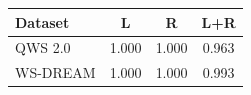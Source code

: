 \begin{tabular}{lccc}
\toprule
Dataset & L & R & L+R \\
\midrule
QWS 2.0 & 1.000 & 1.000 & 0.963 \\
WS-DREAM & 1.000 & 1.000 & 0.993 \\
\bottomrule
\end{tabular}
